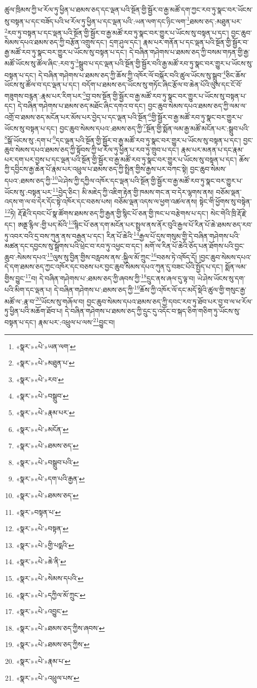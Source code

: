 ཚུལ་ཁྲིམས་ཀྱི་ཕ་རོལ་ཏུ་ཕྱིན་པ་ཐམས་ཅད་དང་ལྡན་པའི་སྔོན་གྱི་སྦྱོར་བ་རྒྱ་མཚོ་དག་ཀྱང་རབ་ཏུ་སྣང་བར་ཡོངས་སུ་བསྟན་པ་དང་བཟོད་པའི་ཕ་རོལ་ཏུ་ཕྱིན་པ་དང་ལྡན་པའི་:ཡན་ལག་དང་ཉིང་ལག་\footnote{«སྣར་»«པེ་»ཡན་ལག་}ཐམས་ཅད་:མཐུན་པར་\footnote{«སྣར་»«པེ་»མཐུན་པ་}རབ་ཏུ་བསྟན་པ་དང་ལྡན་པའི་སྔོན་གྱི་སྦྱོར་བ་རྒྱ་མཚོ་རབ་ཏུ་སྣང་བར་གྱུར་པ་ཡོངས་སུ་བསྟན་པ་དང་། བྱང་ཆུབ་སེམས་དཔའ་ཐམས་ཅད་ཀྱི་བརྩོན་འགྲུས་དང་། དྲག་ཤུལ་དང་། རྣམ་པར་གནོན་པ་དང་ལྡན་པའི་སྔོན་གྱི་སྦྱོར་བ་རྒྱ་མཚོ་རབ་ཏུ་སྣང་བར་གྱུར་པ་ཡོངས་སུ་བསྟན་པ་དང་། དེ་བཞིན་གཤེགས་པ་ཐམས་ཅད་ཀྱི་བསམ་གཏན་གྱི་རྒྱ་མཚོ་ཡོངས་སུ་ཚོལ་ཞིང་:རབ་ཏུ་\footnote{«སྣར་»«པེ་»རབ་}སྒྲུབ་པ་དང་ལྡན་པའི་སྔོན་གྱི་སྦྱོར་བའི་རྒྱ་མཚོ་རབ་ཏུ་སྣང་བར་གྱུར་པ་ཡོངས་སུ་བསྟན་པ་དང་། དེ་བཞིན་གཤེགས་པ་ཐམས་ཅད་ཀྱི་ཆོས་ཀྱི་འཁོར་ལོ་བསྐོར་བའི་ཚུལ་ཡོངས་སུ་སྒྲུབ་\footnote{«སྣར་»«པེ་»བསྒྲུབ་}ཅིང་ཆོས་ཡོངས་སུ་ཚོལ་བ་དང་ལྡན་པ་དང་། བདོག་པ་ཐམས་ཅད་ཡོངས་སུ་གཏོང་ཞིང་རྩོལ་བ་ཆེན་པོའི་ལུས་དང་ངོ་བོ་གཟུགས་བརྙན་:རྣམ་པར་རིག་པར་\footnote{«སྣར་»«པེ་»རྣམ་པར་}བྱ་བས་སྔོན་གྱི་སྦྱོར་བ་རྒྱ་མཚོ་རབ་ཏུ་སྣང་བར་གྱུར་པ་ཡོངས་སུ་བསྟན་པ་དང་། དེ་བཞིན་གཤེགས་པ་ཐམས་ཅད་མཐོང་ཞིང་དགའ་བ་དང་། བྱང་ཆུབ་སེམས་དཔའ་ཐམས་ཅད་ཀྱི་ལམ་ལ་འགྲོ་བ་ཐམས་ཅད་མངོན་པར་མོས་པར་བྱེད་པ་དང་ལྡན་པའི་སྔོན་\footnote{«སྣར་»«པེ་»མངོན་}གྱི་སྦྱོར་བ་རྒྱ་མཚོ་རབ་ཏུ་སྣང་བར་གྱུར་པ་ཡོངས་སུ་བསྟན་པ་དང་། བྱང་ཆུབ་སེམས་དཔའ་:ཐམས་ཅད་ཀྱི་\footnote{«སྣར་»«པེ་»ཐམས་ཅད་}སྔོན་གྱི་སྨོན་ལམ་རྒྱ་མཚོ་མངོན་པར་:སྒྲུབ་པའི་\footnote{«སྣར་»«པེ་»བསྒྲུབ་པའི་}སྒོ་ཡོངས་སུ་:དག་པ་\footnote{«སྣར་»«པེ་»དག་པའི་རྒྱན་}དང་ལྡན་པའི་སྔོན་གྱི་སྦྱོར་བ་རྒྱ་མཚོ་རབ་ཏུ་སྣང་བར་གྱུར་པ་ཡོངས་སུ་བསྟན་པ་དང་། བྱང་ཆུབ་སེམས་དཔའ་ཐམས་ཅད་ཀྱི་སྟོབས་ཀྱི་ཕ་རོལ་ཏུ་ཕྱིན་པ་རབ་ཏུ་གྲུབ་པ་དང་། རྣམ་པར་མནན་པ་དང་རྣམ་པར་དག་པར་བྱས་པ་དང་ལྡན་པའི་སྔོན་གྱི་སྦྱོར་བ་རྒྱ་མཚོ་རབ་ཏུ་སྣང་བར་གྱུར་པ་ཡོངས་སུ་བསྟན་པ་དང་། ཆོས་ཀྱི་དབྱིངས་རྒྱ་ཆེན་པོ་རྣམ་པར་འཕྲུལ་པ་ཐམས་ཅད་ཀྱི་སྤྲིན་གྱིས་རྒྱས་པར་བཀང་སྟེ། བྱང་ཆུབ་སེམས་དཔའ་:ཐམས་ཅད་ཀྱི་\footnote{«སྣར་»«པེ་»ཐམས་ཅད་}ཡེ་ཤེས་ཀྱི་དཀྱིལ་འཁོར་དང་ལྡན་པའི་སྔོན་གྱི་སྦྱོར་བ་རྒྱ་མཚོ་རབ་ཏུ་སྣང་བར་གྱུར་པ་ཡོངས་སུ་:བསྟན་པར་\footnote{«སྣར་»བསྟན་པ་}བྱེད་ཅིང་། མི་མཇེད་ཀྱི་འཇིག་རྟེན་གྱི་ཁམས་གང་ན་བ་དེར་ལྷགས་ནས། བཅོམ་ལྡན་འདས་ག་ལ་བ་དེར་དོང་སྟེ་འཁོར་དང་བཅས་པས། བཅོམ་ལྡན་འདས་ལ་ཕྱག་འཚལ་ནས། སྟེང་གི་ཕྱོགས་སུ་བསྟེན་\footnote{«སྣར་»«པེ་»བསྟན་}ཏེ། རྡོ་རྗེའི་དབང་པོ་སྣ་ཚོགས་ཐམས་ཅད་ཀྱི་རྒྱན་གྱི་སྙིང་པོ་ཅན་གྱི་ཁང་པ་བརྩེགས་པ་དང་། སེང་གེའི་ཁྲི་རྡོ་རྗེ་དང་། ཨནྡ་རྙིལ་:གྱི་པད་མོའི་\footnote{«སྣར་»«པེ་»གྱི་པདྨའི་}སྙིང་པོ་ཅན་དག་མངོན་པར་སྤྲུལ་ནས་ནོར་བུའི་རྒྱལ་པོ་རིན་པོ་ཆེ་ཐམས་ཅད་རབ་ཏུ་འབར་བའི་དྲ་བས་ཀུན་ནས་བརྒྱན་པ་དང་། རིན་པོ་ཆེའི་\footnote{«སྣར་»«པེ་»ཆེ་ནི་}རྒྱལ་པོ་དུས་གསུམ་གྱི་དེ་བཞིན་གཤེགས་པའི་མཚན་དང་དབྱངས་སུ་སྒྲོགས་པའི་ཕྲེང་བ་རབ་ཏུ་འཕྱང་བ་དང་། མགོ་ལ་རིན་པོ་ཆེའི་ཅོད་པན་ཐོགས་པའི་བྱང་ཆུབ་:སེམས་དཔའ་\footnote{«སྣར་»«པེ་»སེམས་དཔའི་}ལུས་སུ་བྱིན་གྱིས་བརླབས་ནས་:སྐྱིལ་མོ་ཀྲུང་\footnote{«སྣར་»«པེ་»དཀྱིལ་མོ་ཀྲུང་}བཅས་ཏེ་འཁོད་དོ། །བྱང་ཆུབ་སེམས་དཔའ་དེ་དག་ཐམས་ཅད་ཀྱང་འཁོར་དང་བཅས་པར་བྱང་ཆུབ་སེམས་དཔའ་ཀུན་དུ་བཟང་པོའི་སྤྱོད་པ་དང་། སྨོན་ལམ་གྱིས་བྱུང་\footnote{«སྣར་»«པེ་»འབྱུང་}བ། དེ་བཞིན་གཤེགས་པ་:ཐམས་ཅད་ཀྱི་ཞབས་ཀྱི་\footnote{«སྣར་»«པེ་»ཐམས་ཅད་ཀྱིས་ཞབས་}དྲུང་ནས་ཞལ་དུ་ལྟ་བ། ཡེ་ཤེས་ཡོངས་སུ་དག་པའི་མིག་དང་ལྡན་པ། དེ་བཞིན་གཤེགས་པ་:ཐམས་ཅད་ཀྱི་\footnote{«སྣར་»«པེ་»ཐམས་ཅད་ཀྱིས་}ཆོས་ཀྱི་འཁོར་ལོ་དང་མདོ་སྡེའི་ཚུལ་གྱི་གསུང་རྒྱ་མཚོ་ལ་:རྣ་བ་\footnote{«སྣར་»«པེ་»རྣམ་པ་}ཡོངས་སུ་གཞོལ་བ། བྱང་ཆུབ་སེམས་དཔའ་ཐམས་ཅད་ཀྱི་དབང་རབ་ཏུ་ཐོབ་པར་བྱ་བ་ལ་ཕ་རོལ་ཏུ་ཕྱིན་པའི་མཆོག་ཐོབ་པ། དེ་བཞིན་གཤེགས་པ་ཐམས་ཅད་ཀྱི་དྲུང་དུ་འདོང་བ་སྐད་ཅིག་གཅིག་ཏུ་ཡོངས་སུ་བསྟན་པ་དང་། རྣམ་པར་:འཕྲུལ་པ་ལས་\footnote{«སྣར་»«པེ་»འཕྲུལ་པས་}བྱུང་བ། 